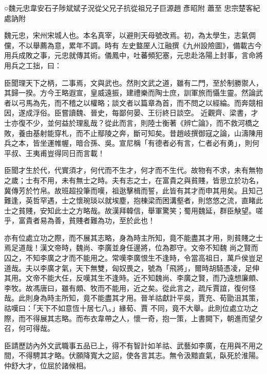 
\begin{pinyinscope}

 ○魏元忠韋安石子陟斌斌子況從父兄子抗從祖兄子巨源趙
 彥昭附
 蕭至
 忠宗楚客紀處訥附



 魏元忠，宋州宋城人也。本名真宰，以避則天母號改焉。初，為太學生，志氣倜儻，不以舉薦為意，累年不調。時有
 左史盩厔人江融撰《九州設險圖》，備載古今用兵成敗之事，元忠就傳其術。儀鳳中，吐蕃頻犯塞，元忠赴洛陽上封事，言命將用兵之工拙，曰：



 臣聞理天下之柄，二事焉，文與武也。然則文武之道，雖有二門，至於制勝禦人，其歸一揆。方今王略遐宣，皇威遠振，建禮樂而陶士庶，訓軍旅而懾生靈。然論武者以弓馬為先，而不稽之以權略；談文者以篇章為首，而不問之以經綸。而奔競相因，遂成浮俗。臣嘗讀魏、晉史，每鄙何晏、王衍終日談空。
 近觀齊、梁書，才士亦復不少，並何益於理亂哉？從此而言，則陸士衡著《辨亡論》，而不救河橋之敗，養由基射能穿札，而不止鄢陵之奔，斷可知矣。昔趙岐撰御寇之論，山濤陳用兵之本，皆坐運帷幄，暗合孫、吳。宣尼稱「有德者必有言，仁者必有勇」，則何平叔、王夷甫豈得同日而言載！



 臣聞才生於代，代實須才，何代而不生才，何才而不生代。故物有不求，未有無物之歲；士有不用，未有無士之時。夫有志之士，在富貴之與貧賤，皆思立於功名，
 冀傳芳於竹帛。故班超投筆而嘆，祖逖擊楫而誓，此皆有其才而申其用矣。且知己難逢，英哲罕遇，士之懷琬琰以就埃塵，抱棟梁而困溝壑者，則悠悠之流，直睹此士之貧賤，安知此士之方略哉。故漢拜韓信，舉軍驚笑；蜀用魏延，群臣觖望。嗟乎，富貴者易為善，貧賤者難為功，至於此也！



 亦有位處立功之際，而不展其志略，身為時主所知，竟不能盡其才用，則貧賤之士焉足道哉！漢文帝時，魏尚、李廣並身任邊將，位為郡守。文帝不知魏
 尚之賢而囚之，不知李廣之才而不能用之。常嘆李廣恨生不逢時，令當高祖日，萬戶侯豈足道哉。夫以李廣才氣，天下無雙，匈奴畏之，號為「飛將」，爾時胡騎憑凌，足伸其用。文帝不能大任，反嘆其生不逢時。近不知魏尚、李廣之賢，而乃遠想廉頗、李牧。故馮唐曰，雖有頗、牧而不能用，近之矣。從此言之，疏斥賈誼，復何怪哉。此則身為時主所知，竟不能盡其才用。晉羊祜獻計平吳，賈充、荀勖沮其策，祜嘆曰：「天下不如意恆十居七八。」緣荀、賈
 不同，竟不大舉。此則位處立功之際，而不得展其志略。而布衣韋帶之人，懷一奇，抱一策，上書闕下，朝進而望夕召，何可得哉。



 臣請歷訪內外文武職事五品已上，得不有智計如羊祜、武藝如李廣，在用與不用之間，不得騁其才略。伏願降寬大之詔，使各言其志。無令汲黯直氣，臥死於淮陽。仲舒大才，位屈於諸候相。




\end{pinyinscope}
